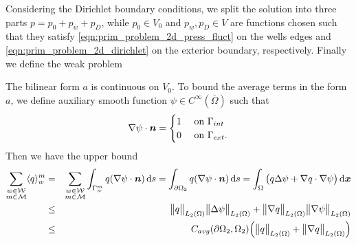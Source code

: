 Considering the Dirichlet boundary conditions, we split the solution into three parts $p=p_0 + p_w + p_D$, while
$p_0\in V_0$ and $p_w, p_D\in V$ are functions chosen such that they satisfy \eqref{eqn:prim_problem_2d_press_fluct} on the wells edges and
\eqref{eqn:prim_problem_2d_dirichlet} on the exterior boundary, respectively.
Finally we define the weak problem

The bilinear form $a$ is continuous on $V_0$. To bound the average terms in the form $a$,
we define auxiliary smooth function $\psi\in C^{\infty}(\overbar\Omega)$ such that
\begin{equation*}
  \nabla\psi\cdot\mathbf{\boldsymbol{n}} =
  \begin{cases}
    1 & \textrm{ on } \Gamma_{int}\\
    0 & \textrm{ on } \Gamma_{ext}.
  \end{cases} \nonumber
\end{equation*}
Then we have the upper bound
\begin{eqnarray}
  \sum_{\substack{w\in \mathcal{W} \\ m\in \mathcal{M}}} \langle q\rangle^m_w
    &=& \sum_{\substack{w\in \mathcal{W} \\ m\in \mathcal{M}}} \int_{\Gamma^m_w} q (\nabla\psi\cdot\mathbf{\boldsymbol{n}}) \,{\rm d} s
    = \int_{\partial\Omega_2} q (\nabla\psi\cdot\mathbf{\boldsymbol{n}}) \,{\rm d} s
    = \int_{\Omega} \big(q \Delta\psi + \nabla q \cdot\nabla\psi \big) \,{\rm d}\mathbf{\boldsymbol{x}} \nonumber\\
    &\leq& \bigl\Vert q\bigr\Vert_{L_2(\Omega)}\bigl\Vert\Delta\psi\bigr\Vert_{L_2(\Omega)} + \bigl\Vert\nabla q\bigr\Vert_{L_2(\Omega)} \bigl\Vert\nabla\psi\bigr\Vert_{L_2(\Omega)} \nonumber\\
    &\leq& C_{avg}(\partial\Omega_2, \Omega_2) \Big(\bigl\Vert q\bigr\Vert_{L_2(\Omega)} + \bigl\Vert\nabla q\bigr\Vert_{L_2(\Omega)}\Big)
\end{eqnarray}
